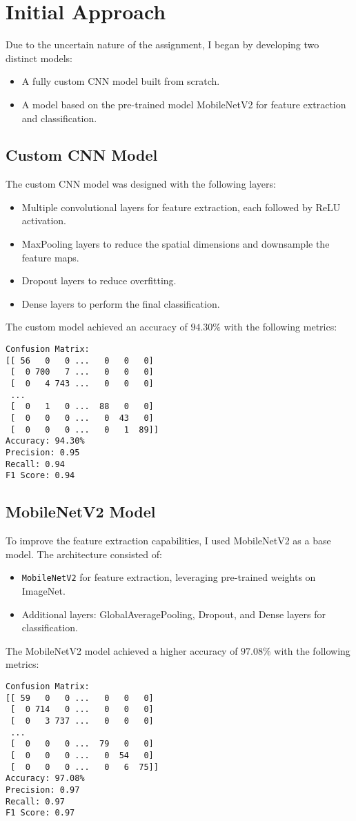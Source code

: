 \documentclass[11pt]{article}
\begin{document}
\section{Initial Approach}
Due to the uncertain nature of the assignment, I began by developing two distinct models:
\begin{itemize}
    \item A fully custom CNN model built from scratch.
    \item A model based on the pre-trained model MobileNetV2 for feature extraction and classification.
\end{itemize}

\subsection{Custom CNN Model}
The custom CNN model was designed with the following layers:
\begin{itemize}
    \item Multiple convolutional layers for feature extraction, each followed by ReLU activation.
    \item MaxPooling layers to reduce the spatial dimensions and downsample the feature maps.
    \item Dropout layers to reduce overfitting.
    \item Dense layers to perform the final classification.
\end{itemize}
The custom model achieved an accuracy of $94.30\%$ with the following metrics:
\begin{verbatim}
Confusion Matrix:
[[ 56   0   0 ...   0   0   0]
 [  0 700   7 ...   0   0   0]
 [  0   4 743 ...   0   0   0]
 ...
 [  0   1   0 ...  88   0   0]
 [  0   0   0 ...   0  43   0]
 [  0   0   0 ...   0   1  89]]
Accuracy: 94.30%
Precision: 0.95
Recall: 0.94
F1 Score: 0.94
\end{verbatim}

\subsection{MobileNetV2 Model}
To improve the feature extraction capabilities, I used MobileNetV2 as a base model. The architecture consisted of:
\begin{itemize}
    \item \texttt{MobileNetV2} for feature extraction, leveraging pre-trained weights on ImageNet.
    \item Additional layers: GlobalAveragePooling, Dropout, and Dense layers for classification.
\end{itemize}
The MobileNetV2 model achieved a higher accuracy of $97.08\%$ with the following metrics:
\begin{verbatim}
Confusion Matrix:
[[ 59   0   0 ...   0   0   0]
 [  0 714   0 ...   0   0   0]
 [  0   3 737 ...   0   0   0]
 ...
 [  0   0   0 ...  79   0   0]
 [  0   0   0 ...   0  54   0]
 [  0   0   0 ...   0   6  75]]
Accuracy: 97.08%
Precision: 0.97
Recall: 0.97
F1 Score: 0.97
\end{verbatim}
\end{document}
